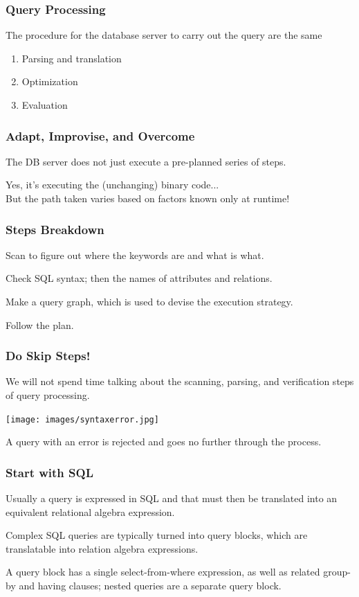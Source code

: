 \begin{frame}
\frametitle{Query Processing}

The procedure for the database server to carry out the query are the same

\begin{enumerate}
	\item Parsing and translation
	\item Optimization
	\item Evaluation
\end{enumerate}

\end{frame}

\begin{frame}
\frametitle{Adapt, Improvise, and Overcome}

The DB server does not just execute a pre-planned series of steps.

Yes, it's executing the (unchanging) binary code...\\
\quad But the path taken varies based on factors known only at runtime!

\end{frame}

\begin{frame}
\frametitle{Steps Breakdown}
Scan to figure out where the keywords are and what is what.

Check SQL syntax; then the names of attributes and relations.

Make a query graph, which is used to devise the execution strategy. 

Follow the plan.

\end{frame}



\begin{frame}
\frametitle{Do Skip Steps!}

We will not spend time talking about the scanning, parsing, and verification steps of query processing.

\begin{center}
\texttt{[image: images/syntaxerror.jpg]}
\end{center}

A query with an error is rejected and goes no further through the process. 

\end{frame}

\begin{frame}
\frametitle{Start with SQL}
Usually a query is expressed in SQL and that must then be translated into an equivalent \alert{relational algebra} expression. 

Complex SQL queries are typically turned into \alert{query blocks}, which are translatable into relation algebra expressions. 

A query block has a single select-from-where expression, as well as related group-by and having clauses; nested queries are a separate query block.

\end{frame}

